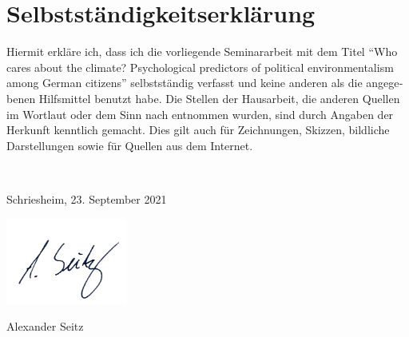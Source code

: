 \section*{Selbstständigkeitserklärung}

\begin{otherlanguage}{ngerman}

Hiermit erkläre ich, dass ich die vorliegende Seminararbeit mit dem Titel ``Who cares about the climate? Psychological predictors of political environmentalism among German citizens'' selbstständig verfasst und keine anderen als die angegebenen Hilfsmittel benutzt habe. Die Stellen der Hausarbeit, die anderen Quellen im Wortlaut oder dem Sinn nach entnommen wurden, sind durch Angaben der Herkunft kenntlich gemacht. Dies gilt auch für Zeichnungen, Skizzen, bildliche Darstellungen sowie für Quellen aus dem Internet.

\

\noindent
Schriesheim, 23. September 2021

\includegraphics[width=4cm]{signature}

\noindent
Alexander Seitz

\end{otherlanguage}
